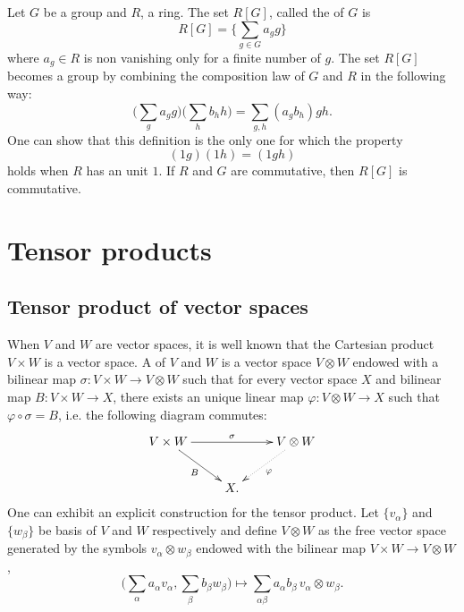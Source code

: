 Let $G$ be a group and $R$, a ring. The set $R[G]$, called the  of $G$ is 
\begin{equation}
	R[G]=\{ \sum_{g\in G}a_gg \}
\end{equation}
where $a_g\in R$ is non vanishing only for a finite number of $g$. The set $R[G]$ becomes a group by combining the composition law of $G$ and $R$ in the following way:
\begin{equation}
	\Big( \sum_ga_gg \Big)\Big( \sum_hb_hh \Big)=\sum_{g,h}(a_gb_h)gh.
\end{equation}
One can show that this definition is the only one for which the property
\[ 
	(1g)(1h)=(1gh)
\]
holds when $R$ has an unit $1$.  If $R$ and $G$ are commutative, then $R[G]$ is commutative.

\section{Tensor products}

					\subsection{Tensor product of vector spaces}

When $V$ and $W$ are vector spaces, it is well known that the Cartesian product $V\times W$ is a vector space. A  of $V$ and $W$ is a vector space $V\otimes W$ endowed with a bilinear map $\sigma\colon V\times W\to V\otimes W$ such that for every vector space $X$ and bilinear map $B\colon V\times W\to X$, there exists an unique linear map $\varphi\colon V\otimes W\to X$ such that $\varphi\circ\sigma=B$, i.e. the following diagram commutes:
\[ 
\xymatrix{%
   V\times W \ar[dr]_{B}\ar[rr]^{\sigma}		&	&V\otimes W\ar@{.>}[dl]^{\varphi}\\
 					&  X.
}	
\]
One can exhibit an explicit construction for the tensor product. Let $\{ v_{\alpha} \}$ and $\{ w_{\beta} \}$ be basis of $V$ and $W$ respectively and define $V\otimes W$ as the free vector space generated by the symbols $v_{\alpha}\otimes w_{\beta}$ endowed with the bilinear map $V\times W\to V\otimes W$,
\[ 
  \big( \sum_{\alpha} a_{\alpha} v_{\alpha},\sum_{\beta} b_{\beta}w_{\beta} \big)\mapsto\sum_{\alpha\beta} a_{\alpha}b_{\beta}\, v_{\alpha}\otimes w_{\beta}.
\]


